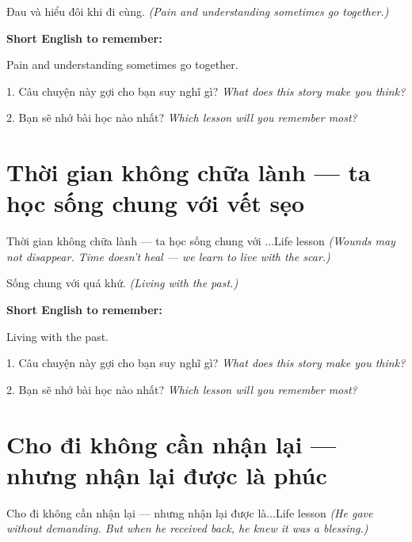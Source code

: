 \begin{baihoc}
Đau và hiểu đôi khi đi cùng.
\textit{(Pain and understanding sometimes go together.)}
\end{baihoc}

\begin{ghinhoanh}
\textbf{Short English to remember:}

Pain and understanding sometimes go together.

\end{ghinhoanh}

\begin{tuhocnhanh}
1. Câu chuyện này gợi cho bạn suy nghĩ gì? \textit{What does this story make you think?}

2. Bạn sẽ nhớ bài học nào nhất? \textit{Which lesson will you remember most?}
\end{tuhocnhanh}
\ngancach


\section{Thời gian không chữa lành — ta học sống chung với vết sẹo}
\begin{truyen}{Thời gian không chữa lành — ta học sống chung với ...}{Life lesson}
\textit{(Wounds may not disappear. Time doesn't heal — we learn to live with the scar.)}
\end{truyen}

\begin{baihoc}
Sống chung với quá khứ.
\textit{(Living with the past.)}
\end{baihoc}

\begin{ghinhoanh}
\textbf{Short English to remember:}

Living with the past.

\end{ghinhoanh}

\begin{tuhocnhanh}
1. Câu chuyện này gợi cho bạn suy nghĩ gì? \textit{What does this story make you think?}

2. Bạn sẽ nhớ bài học nào nhất? \textit{Which lesson will you remember most?}
\end{tuhocnhanh}
\ngancach


\section{Cho đi không cần nhận lại — nhưng nhận lại được là phúc}
\begin{truyen}{Cho đi không cần nhận lại — nhưng nhận lại được là...}{Life lesson}
\textit{(He gave without demanding. But when he received back, he knew it was a blessing.)}
\end{truyen}

